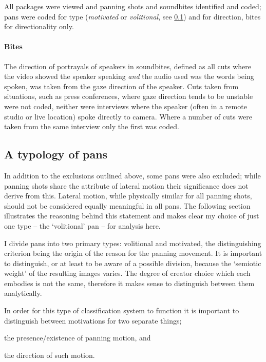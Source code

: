 \documentclass[11pt, oneside, a4paper]{scrartcl}
\newenvironment{close_enum}{
\begin{enumerate}
 \setlength{\itemsep}{1pt}
 \setlength{\parskip}{1pt}
 \setlength{\parsep}{0pt}}{\end{enumerate}
}
\begin{document}
All packages were viewed and panning shots and soundbites identified and coded; pans were coded for type (\emph{motivated} or \emph{volitional}, see \ref{subsec:typol}) and for direction, bites for directionality only. 

\paragraph{Bites}
The direction of portrayals of speakers in soundbites, defined as all cuts where the video showed the speaker speaking \emph{and} the audio used was the words being spoken, was taken from the gaze direction of the speaker. Cuts taken from situations, such as press conferences, where gaze direction tends to be unstable were not coded, neither were interviews where the speaker (often in a remote studio or live location) spoke directly to camera. Where a number of cuts were taken from the same interview only the first was coded.

\subsection{A typology of pans}
\label{subsec:typol}

In addition to the exclusions outlined above, some pans were also excluded; while panning shots share the attribute of lateral motion their significance does not derive from this. Lateral motion, while physically similar for all panning shots, should not be considered equally meaningful in all pans. The following section illustrates the reasoning behind this statement and makes clear my choice of just one type -- the `volitional' pan -- for analysis here.

\bigskip	

I divide pans into two primary types: volitional and motivated, the distinguishing criterion being the origin of the reason for the panning movement. It is important to distinguish, or at least to be aware of a possible division, because the `semiotic weight' of the resulting images varies. The degree of creator choice which each embodies is not the same, therefore it makes sense to distinguish between them analytically.

In order for this type of classification system to function it is important to distinguish between motivations for two separate things;

\begin{close_enum}
\item the presence/existence of panning motion, and
\item the direction of such motion.
\end{close_enum}
\end{document}
